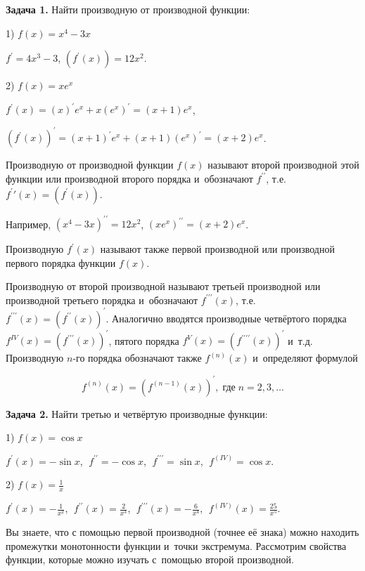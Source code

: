 
\textbf{Задача 1.}\label{ex:5_6_1} Найти производную от производной функции:

1) $f(x) = x^{4} - 3x$

$f^\prime = 4x^{3} - 3$, $\left( f^\prime (x) \right) = 12x^{2}$.

2) $f(x) = x e^{x}$

$f^\prime (x) = (x)^\prime e^{x} + x(e^{x})^\prime = (x + 1) e^{x}$, 

$\left( f^\prime (x) \right)^\prime =
(x + 1)^\prime e^{x} + (x + 1) (e^{x})^\prime = 
(x + 2) e^{x}$.

Производную от производной функции $f(x)$ называют второй производной этой функции
или производной второго порядка и~обозначают $f^{\prime\prime}$,
т.е.\ $f^\prime\prime (x) = \left( f^\prime (x) \right)$.

Например,
$(x^{4} - 3x)^{\prime\prime} = 12x^{2}$,
$(x e^{x})^{\prime\prime} = (x + 2) e^{x}$.

Производную $f^\prime (x)$ называют также первой производной или
производной первого порядка функции $f(x)$.

Производную от второй производной называют третьей производной или
производной третьего порядка и~обозначают $f^{\prime\prime\prime} (x)$,
т.е.\ $f^{\prime\prime\prime} (x) = \left( f^{\prime\prime} (x) \right)^\prime$.
Аналогично вводятся производные четвёртого порядка 
$f^{IV} (x) = \left( f^{\prime\prime\prime} (x) \right)^\prime$,
пятого порядка
$f^{V} (x) = \left( f^{\prime\prime\prime\prime} (x) \right)^\prime$ и~т.д.
Производную $n$-го порядка обозначают также $f^{(n)} (x)$ 
и~определяют формулой

\begin{equation*}
f^{(n)} (x) = \left( f^{(n-1)} (x) \right)^\prime, \; \text{где} \; n = 2,3, \dots
\end{equation*}

\textbf{Задача 2.} Найти третью и четвёртую производные функции:

1) $f(x) = \cos x$

$f^\prime (x) = -\sin x$,
$\; f^{\prime\prime} = -\cos x$,
$\; f^{\prime\prime\prime} = \sin x$,
$\; f^{(IV)} = \cos x$.

2) $\displaystyle f(x) = \frac{1}{x}$

$\displaystyle f^\prime (x) = -\frac{1}{x^{2}}$,
$\displaystyle \; f^{\prime\prime} (x) = \frac{2}{x^{3}}$,
$\displaystyle \; f^{\prime\prime\prime} (x) = -\frac{6}{x^{4}}$,
$\displaystyle \; f^{(IV)} (x) = \frac{25}{x^{5}}$.

Вы знаете, что с помощью первой производной (точнее её знака) можно находить промежутки
монотонности функции и~точки экстремума. Рассмотрим свойства функции, которые можно
изучать с~помощью второй производной.
